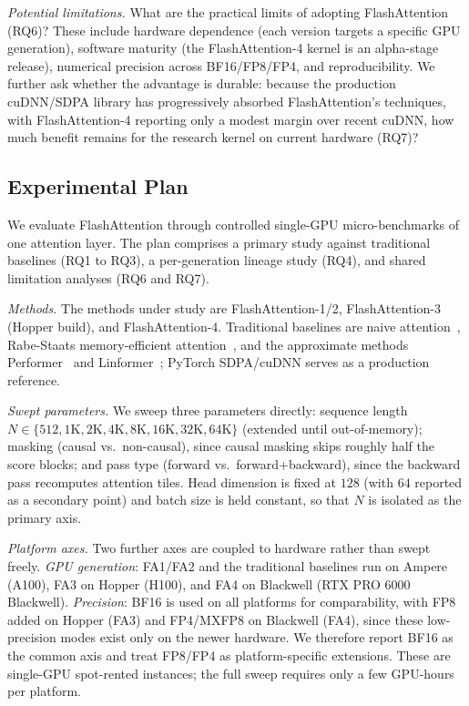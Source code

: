 \documentclass[sigconf,nonacm]{acmart}
\newcommand{\lead}[1]{\textit{#1}\quad}
\begin{document}
\lead{Potential limitations.}
What are the practical limits of adopting FlashAttention (RQ6)? These include
hardware dependence (each version targets a specific GPU generation), software
maturity (the FlashAttention-4 kernel is an alpha-stage release), numerical
precision across BF16/FP8/FP4, and reproducibility. We further ask whether the
advantage is durable: because the production cuDNN/SDPA library has progressively
absorbed FlashAttention's techniques, with FlashAttention-4 reporting only a
modest margin over recent cuDNN, how much benefit remains for the research kernel
on current hardware (RQ7)?

\subsection{Experimental Plan}
\label{subsec:expplan}
We evaluate FlashAttention through controlled single-GPU micro-benchmarks of one
attention layer. The plan comprises a primary study against traditional baselines
(RQ1 to RQ3), a per-generation lineage study (RQ4), and shared limitation analyses
(RQ6 and RQ7).

\lead{Methods.}
The methods under study are FlashAttention-1/2,
FlashAttention-3 (Hopper build), and FlashAttention-4. Traditional baselines are
naive attention~\cite{vaswani2017attention},
Rabe-Staats memory-efficient attention~\cite{rabe2021selfattention}, and the
approximate methods Performer~\cite{choromanski2021performer} and
Linformer~\cite{wang2020linformer}; PyTorch SDPA/cuDNN serves as a production
reference.

\lead{Swept parameters.}
We sweep three parameters directly: sequence length $N \in \{512, 1\mathrm{K},
2\mathrm{K}, 4\mathrm{K}, 8\mathrm{K}, 16\mathrm{K}, 32\mathrm{K}, 64\mathrm{K}\}$
(extended until out-of-memory); masking (causal vs.\ non-causal), since causal
masking skips roughly half the score blocks; and pass type (forward vs.\
forward+backward), since the backward pass recomputes attention tiles. Head
dimension is fixed at $128$ (with $64$ reported as a secondary point) and batch
size is held constant, so that $N$ is isolated as the primary axis.

\lead{Platform axes.}
Two further axes are coupled to hardware rather than swept freely. \emph{GPU
generation}: FA1/FA2 and the traditional baselines run on Ampere (A100), FA3 on
Hopper (H100), and FA4 on Blackwell (RTX PRO 6000 Blackwell). \emph{Precision}:
BF16 is used on all platforms for comparability, with FP8 added on Hopper (FA3)
and FP4/MXFP8 on Blackwell (FA4), since these low-precision modes exist only on
the newer hardware. We therefore report BF16 as the common axis and treat FP8/FP4
as platform-specific extensions. These are single-GPU spot-rented instances; the
full sweep requires only a few GPU-hours per platform.
\end{document}
